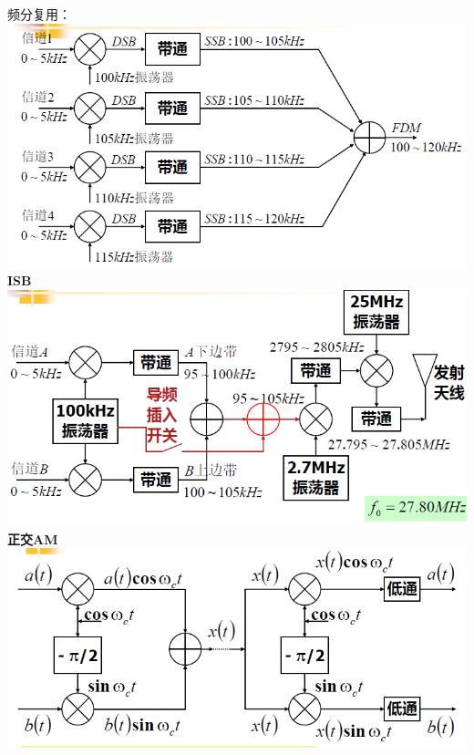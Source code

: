 \documentclass[10.5pt,landscape]{article}
\begin{document}
\begin{multicols*}{4}
  频分复用：
    \includegraphics[scale=0.28]{FDM}\newline
 \textbf{ISB}\newline
 \includegraphics[scale=0.28]{ISB}\newline
 \textbf{正交AM}\newline
 \includegraphics[scale=0.28]{OAM}\newline
 

\end{multicols*}
\end{document}
